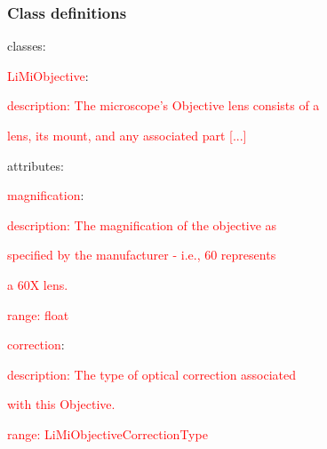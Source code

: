 \begin{frame}
  \frametitle{Class definitions}

\begin{semiverbatim}
classes:

\hspace{1em}\textcolor<2>{red}{LiMiObjective}:

\hspace{2em}\textcolor<3>{red}{description: The microscope's Objective lens consists of a}

\hspace{3em}\textcolor<3>{red}{lens, its mount, and any associated part [...]}

\hspace{2em}attributes:

\hspace{3em}\textcolor<4>{red}{magnification}:

\hspace{4em}\textcolor<5>{red}{description: The magnification of the objective as}

\hspace{5em}\textcolor<5>{red}{specified by the manufacturer - i.e., 60 represents}

\hspace{5em}\textcolor<5>{red}{a 60X lens.}

\hspace{4em}\textcolor<6>{red}{range: float}

\hspace{3em}\textcolor<4>{red}{correction}:

\hspace{4em}\textcolor<5>{red}{description: The type of optical correction associated}

\hspace{5em}\textcolor<5>{red}{with this Objective.}

\hspace{4em}\textcolor<6>{red}{range: LiMiObjectiveCorrectionType}
\end{semiverbatim}
\end{frame}

